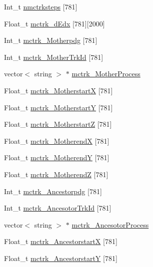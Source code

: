 \begin{DoxyCompactItemize}
\item 
Int\-\_\-t \hyperlink{classanatree_a22f183fefa5ec630ff30c94de79614a1}{nmctrksteps} \mbox{[}781\mbox{]}
\item 
Float\-\_\-t \hyperlink{classanatree_ad0add36216aaa16bee6e1ff6c3905456}{mctrk\-\_\-d\-Edx} \mbox{[}781\mbox{]}\mbox{[}2000\mbox{]}
\item 
Int\-\_\-t \hyperlink{classanatree_a29ed34336b58343e063896bdb0e8af5b}{mctrk\-\_\-\-Motherpdg} \mbox{[}781\mbox{]}
\item 
Int\-\_\-t \hyperlink{classanatree_adcb3116bc91938e017a7dcf87195dd40}{mctrk\-\_\-\-Mother\-Trk\-Id} \mbox{[}781\mbox{]}
\item 
vector$<$ string $>$ $\ast$ \hyperlink{classanatree_a1b9d799bba5001e7e69a479c579facdc}{mctrk\-\_\-\-Mother\-Process}
\item 
Float\-\_\-t \hyperlink{classanatree_aa2b40636eb7f684ab48f720ec9a0e293}{mctrk\-\_\-\-Motherstart\-X} \mbox{[}781\mbox{]}
\item 
Float\-\_\-t \hyperlink{classanatree_a66dc0f00af6ef2ab01d47ec9651630f3}{mctrk\-\_\-\-Motherstart\-Y} \mbox{[}781\mbox{]}
\item 
Float\-\_\-t \hyperlink{classanatree_ab5f3036817f0e58b09c63c7134866451}{mctrk\-\_\-\-Motherstart\-Z} \mbox{[}781\mbox{]}
\item 
Float\-\_\-t \hyperlink{classanatree_ae629fee906b17c4ca344da2584185597}{mctrk\-\_\-\-Motherend\-X} \mbox{[}781\mbox{]}
\item 
Float\-\_\-t \hyperlink{classanatree_a8fff5a031986dba3d08518a592ca27c3}{mctrk\-\_\-\-Motherend\-Y} \mbox{[}781\mbox{]}
\item 
Float\-\_\-t \hyperlink{classanatree_a5b480d24c2601b0edafa2927e2da7935}{mctrk\-\_\-\-Motherend\-Z} \mbox{[}781\mbox{]}
\item 
Int\-\_\-t \hyperlink{classanatree_a32b98717938615eadbbe392ac02c0617}{mctrk\-\_\-\-Ancestorpdg} \mbox{[}781\mbox{]}
\item 
Int\-\_\-t \hyperlink{classanatree_adcdd8a3026ca8feb1817c4438058eb47}{mctrk\-\_\-\-Ancesotor\-Trk\-Id} \mbox{[}781\mbox{]}
\item 
vector$<$ string $>$ $\ast$ \hyperlink{classanatree_a39f3ac00257d23e09c7d76ab850f7df5}{mctrk\-\_\-\-Ancesotor\-Process}
\item 
Float\-\_\-t \hyperlink{classanatree_a6d53a3a4342de0f17aeb55b3078e8523}{mctrk\-\_\-\-Ancestorstart\-X} \mbox{[}781\mbox{]}
\item 
Float\-\_\-t \hyperlink{classanatree_a2303289878cef82f0e009e600e7b47b1}{mctrk\-\_\-\-Ancestorstart\-Y} \mbox{[}781\mbox{]}

\end{DoxyCompactItemize}
